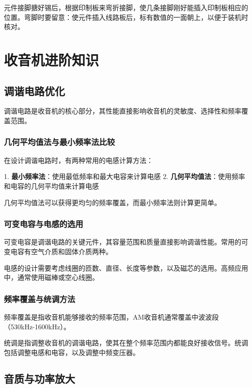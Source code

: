 \documentclass[12pt,UTF8]{ctexbook}
\begin{document}
元件接脚搪好锡后，根据印制板来弯折接脚，使几条接脚刚好能插入印制板相应的位置。弯脚时要留意：使元件插入线路板后，标有数值的一面朝上，以便于装机时核对。

\part{收音机进阶知识}

\chapter{调谐电路优化}

调谐电路是收音机的核心部分，其性能直接影响收音机的灵敏度、选择性和频率覆盖范围。

\section{几何平均值法与最小频率法比较}

在设计调谐电路时，有两种常用的电感计算方法：

1. \textbf{最小频率法}：使用最低频率和最大电容来计算电感
2. \textbf{几何平均值法}：使用频率和电容的几何平均值来计算电感

几何平均值法可以获得更均匀的频率覆盖，而最小频率法则计算更简单。

\section{可变电容与电感的选用}

可变电容是调谐电路的关键元件，其容量范围和质量直接影响调谐性能。常用的可变电容有空气介质和固体介质两种。

电感的设计需要考虑线圈的匝数、直径、长度等参数，以及磁芯的选用。高频应用中，通常使用磁棒或空心线圈。

\section{频率覆盖与统调方法}

频率覆盖是指收音机能够接收的频率范围，AM收音机通常覆盖中波波段（530kHz-1600kHz）。

统调是指调整收音机的调谐电路，使其在整个频率范围内都能良好接收信号。统调包括调整电感和电容，以及调整中频变压器。

\chapter{音质与功率放大}
\end{document}
